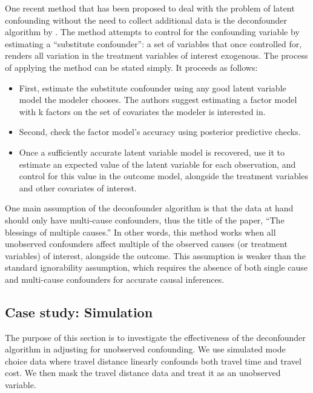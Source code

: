 One recent method that has been proposed to deal with the problem of latent
confounding without the need to collect additional data is the deconfounder
algorithm by \citet{wang_2019_blessings}. The method attempts to control for the
confounding variable by estimating a ``substitute confounder'': a set of variables
that once controlled for, renders all variation in the treatment variables of
interest exogenous. The process of applying the method can be stated simply.
It proceeds as follows:
\begin{itemize}
	\item First, estimate the substitute confounder using any good latent variable
	model the modeler chooses. The authors suggest estimating a factor model
	with k factors on the set of covariates the modeler is interested in.
	\item Second, check the factor model's accuracy using posterior predictive
	checks.
	\item Once a sufficiently accurate latent variable model is recovered, use it
	to estimate an expected value of the latent variable for each observation,
	and control for this value in the outcome model, alongside the treatment
	variables and other covariates of interest.
\end{itemize}



One main assumption of the deconfounder algorithm is that the data at hand
should only have multi-cause confounders, thus the title of the paper, ``The
blessings of multiple causes.'' In other words, this method works when all
unobserved confounders affect multiple of the observed causes (or treatment
variables) of interest, alongside the outcome. This assumption is weaker than
the standard ignorability assumption, which requires the absence of both
single cause and multi-cause confounders for accurate causal inferences.



\subsection{Case study: Simulation}
\label{sec:deconfounder-simulation}

The purpose of this section is to investigate the effectiveness of the
deconfounder algorithm \citep{wang_2019_blessings} in adjusting for unobserved
confounding. We use simulated mode choice data where travel distance
linearly confounds both travel time and travel cost. We then mask the travel
distance data and treat it as an unobserved variable.


